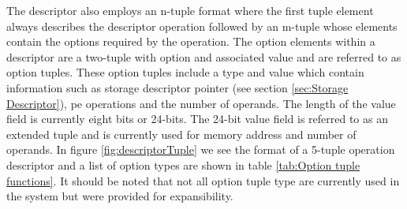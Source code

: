 The descriptor also employs an n-tuple format where the first tuple element always describes the descriptor operation followed by an m-tuple whose elements contain the options required by the operation.
The option elements within a descriptor are a two-tuple with option and associated value and are referred to as option tuples.
These option tuples include a type and value which contain information such as storage descriptor pointer (see section \ref{sec:Storage Descriptor}), \ac{pe} operations and the number of operands.
The length of the value field is currently eight bits or 24-bits. The 24-bit value field is referred to as an extended tuple and is currently used for memory address and number of operands.
In figure \ref{fig:descriptorTuple} we see the format of a 5-tuple operation descriptor and a list of option types are shown in table \ref{tab:Option tuple functions}.
It should be noted that not all option tuple type are currently used in the system but were provided for expansibility.

\iffalse
\begin{figure}[!t]
\centering
\captionsetup{justification=centering}
\captionsetup{width=.9\linewidth}
\centerline{
\mbox{\texttt{[image: descriptorTuple]}}
}
\caption{Operation descriptor (5-tuple example)}
\label{fig:descriptorTuple}
\end{figure}
\fi


